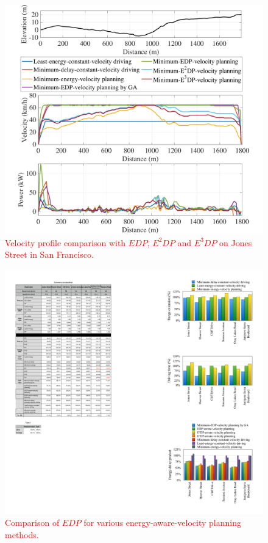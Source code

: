 \documentclass[onecolumn]{IEEEconf}
\begin{document}
\begin{description}
\begin{figure} [h!]
\centering
 \renewcommand\thefigure{12}
\includegraphics[width=0.65\hsize]{Figures/EDP_comp_profile.pdf}
\caption{\textcolor{red}{Velocity profile comparison with $EDP$, $E^2DP$ and $E^3DP$ on  Jones Street in San Francisco.}}
\label{fig:EDP_aware_velocity_planning}
\end{figure} 



\begin{figure}[h!]
\centering
 \renewcommand\thefigure{13}
\includegraphics[width=0.55\hsize]{Figures/EDP_comp_bar.pdf}
\caption{\textcolor{red}{Comparison of $EDP$ for various energy-aware-velocity planning methods.}}
\label{fig:EDP_bar}
\end{figure} 

\end{description}
\newpage
~
\newpage
\end{document}
